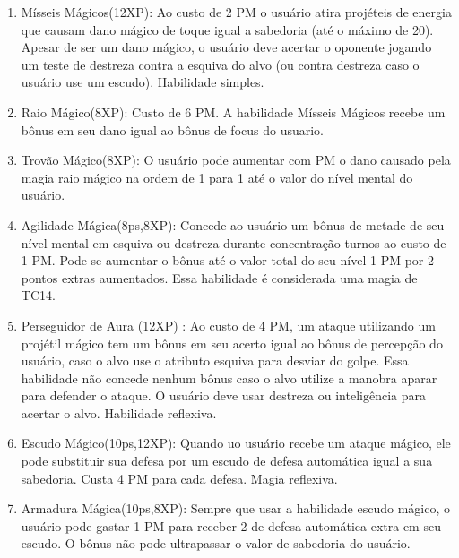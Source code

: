 \begin{enumerate}
	 	\item Mísseis Mágicos(12XP): Ao custo de 2 PM o usuário atira projéteis de energia que causam dano mágico de toque igual a sabedoria (até o máximo de 20). Apesar de ser um dano mágico, o usuário deve acertar o oponente jogando um teste de destreza contra a esquiva do alvo (ou contra destreza caso o usuário use um escudo). Habilidade simples.

 	\item Raio Mágico(8XP): Custo de 6 PM.
A habilidade Mísseis Mágicos recebe um bônus em seu dano igual ao bônus de focus do usuario. 

 	\item Trovão Mágico(8XP): O usuário pode aumentar com PM o dano causado pela magia raio mágico na ordem de 1 para 1 até o valor do nível mental do usuário.  
  
  	 	\item Agilidade Mágica(8ps,8XP): Concede ao usuário um bônus de metade de seu nível  mental em esquiva ou destreza durante concentração turnos ao custo de 1 PM. Pode-se aumentar o bônus até o valor total do seu nível 1 PM por 2 pontos extras aumentados. Essa habilidade é considerada uma magia de TC14.  	
			
			  	 	\item Perseguidor de Aura (12XP) : Ao custo de 4 PM, um ataque utilizando um projétil mágico tem um bônus em seu acerto igual ao bônus de percepção do usuário, caso o alvo use o atributo esquiva para desviar do golpe. Essa habilidade não concede nenhum bônus caso o alvo utilize a manobra aparar para defender o ataque. O usuário deve usar destreza ou inteligência para acertar o alvo. Habilidade reflexiva. 
  	  
  	 	\item Escudo Mágico(10ps,12XP): Quando uo usuário recebe um ataque mágico, ele pode substituir sua defesa por um escudo de defesa automática igual a sua sabedoria. Custa 4 PM para cada defesa. Magia reflexiva.

  	 	\item Armadura Mágica(10ps,8XP): Sempre que usar a habilidade escudo mágico, o usuário pode gastar 1 PM para receber 2 de defesa automática extra em seu escudo. O bônus não pode ultrapassar o valor de sabedoria do usuário.
  
  

\end{enumerate}
